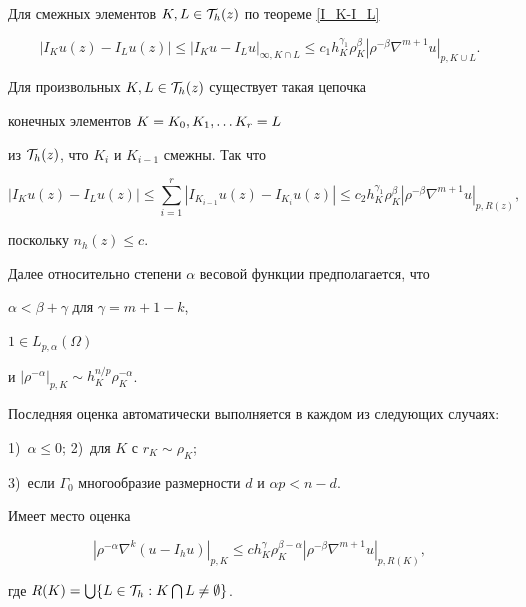 \begin{pf}


Для смежных элементов $K, L \in {\cal T}_h(z)$ по теореме \ref{I_K-I_L} 


$$


|I_Ku(z)-I_Lu(z)| \le {|I_Ku-I_Lu|}_{\infty,K\cap L} \le c_1 h_K^{\gamma_1} 


\rho_K^\beta{|\rho^{-\beta}\nabla^{m+1}u|}_{p,K \cup L}. 


$$ 


Для произвольных $K, L \in {\cal T}_h(z)$ существует такая цепочка 


конечных элементов $K=K_0, K_1, \dotsc\linebreak K_r=L$


из ${\cal T}_h(z)$, что $K_i$ и $K_{i-1}$ смежны. Так что 


$$


|I_Ku(z)-I_Lu(z)|\le \sum_{i=1}^{r} |I_{K_{i-1}}u(z)-I_{K_i}u(z)| \le c_2 


h_K^{\gamma_1} 


\rho_K^\beta{|\rho^{-\beta}\nabla^{m+1}u|}_{p,R(z)}, 


$$


поскольку $n_h(z) \le c$.


\end{pf}





Далее относительно степени $\alpha$ весовой функции предполагается, что 


$\alpha < \beta+\gamma$ для $\gamma=m+1-k$, 


$1 \in L_{p,\alpha}(\Omega)$


и ${|\rho^{-\alpha}|}_{p,K} \sim h_K^{n/p}\rho_K^{-\alpha}$. 


Последняя оценка автоматически выполняется в каждом из следующих случаях: 


1)~$\alpha \le 0$; 2)~для $K$ с $r_K \sim \rho_K$;


3)~если $\Gamma_0$ многообразие размерности $d$ и $\alpha p < n-d$.





\begin{thm}


Имеет место оценка 


$$


{|\rho^{-\alpha}\nabla^k(u-I_hu)|}_{p,K} \le


c h_K^\gamma \rho_K^{\beta-\alpha} 


{|\rho^{-\beta}\nabla^{m+1}u|}_{p,R(K)},


$$


где $R(K)=\bigcup \{L \in {\cal T}_h: K \bigcap L \neq \emptyset \}$.


\end{thm}






